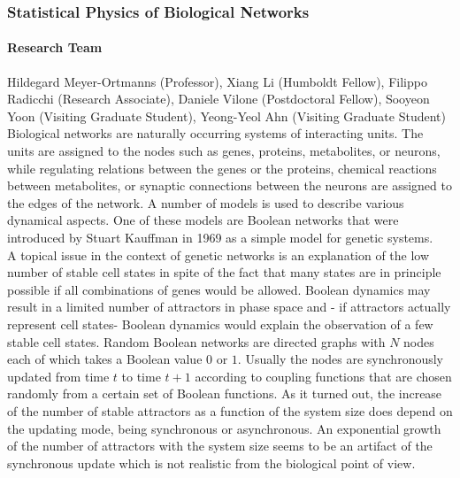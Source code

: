 \subsubsection{Statistical Physics of Biological Networks}

\paragraph{Research Team} Hildegard Meyer-Ortmanns (Professor), Xiang Li (Humboldt Fellow),
Filippo Radicchi (Research Associate), Daniele Vilone
(Postdoctoral Fellow), Sooyeon Yoon (Visiting Graduate Student), Yeong-Yeol Ahn (Visiting Graduate Student)\\

Biological networks are naturally occurring systems of interacting
units. The units are assigned to the nodes such as genes, proteins, metabolites, or neurons,
while regulating relations between the genes or the
proteins, chemical reactions between metabolites, or
synaptic connections between the neurons are assigned to the edges of
the network. A number of models is used to describe various
dynamical aspects. One of these models are Boolean networks that were introduced
by Stuart Kauffman in 1969 as a simple model for genetic systems.\\
A topical issue in the context of genetic networks is an
explanation of the low number of stable cell states in spite of the fact that
many states are in principle possible if all combinations of
genes would be allowed. Boolean dynamics may result in a limited
number of attractors in phase space and - if attractors actually represent cell states- Boolean
dynamics would explain
the observation of a few stable cell states. Random Boolean networks are directed
graphs with $N$ nodes each of which takes a Boolean value $0$ or $1$.
Usually the nodes are synchronously updated from time $t$ to time
$t+1$ according to coupling functions that are chosen randomly
from a certain set of Boolean functions. As it turned out, the
increase of the number of stable attractors as a function of the
system size does depend on the updating mode, being
synchronous or asynchronous. An exponential growth of the
number of attractors with the system size seems to be an artifact of the
synchronous update which is not realistic from the biological
point of view.

